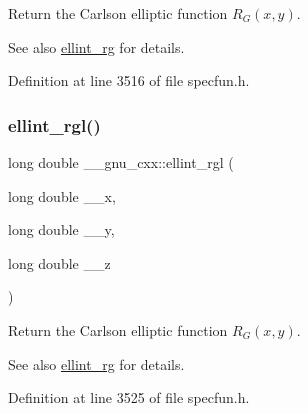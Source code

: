 Return the Carlson elliptic function $ R_G(x,y) $.

\begin{DoxySeeAlso}{See also}
\hyperlink{group__gnu__math__spec__func_gadf618529d6106c1c1bc1e9212c4fed12}{ellint\+\_\+rg} for details. 
\end{DoxySeeAlso}


Definition at line 3516 of file specfun.\+h.

\mbox{\label{group__gnu__math__spec__func_ga563455d515ed845988552432108a21be}} 
\subsubsection{\texorpdfstring{ellint\+\_\+rgl()}{ellint\_rgl()}}
{\footnotesize\ttfamily long double \+\_\+\+\_\+gnu\+\_\+cxx\+::ellint\+\_\+rgl (\begin{DoxyParamCaption}\item[{long double}]{\+\_\+\+\_\+x,  }\item[{long double}]{\+\_\+\+\_\+y,  }\item[{long double}]{\+\_\+\+\_\+z }\end{DoxyParamCaption})\hspace{0.3cm}{\ttfamily [inline]}}

Return the Carlson elliptic function $ R_G(x,y) $.

\begin{DoxySeeAlso}{See also}
\hyperlink{group__gnu__math__spec__func_gadf618529d6106c1c1bc1e9212c4fed12}{ellint\+\_\+rg} for details. 
\end{DoxySeeAlso}


Definition at line 3525 of file specfun.\+h.

\mbox{\label{group__gnu__math__spec__func_gadccabc8df929cc03745286ed1574a3ba}} 
